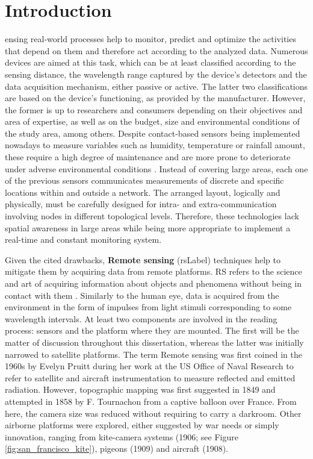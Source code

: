 \setchapterpreamble[u]{\margintoc}
\chapter{Introduction}

\lettrine[findent=0pt]{}{ }ensing real-world processes help to monitor, predict and optimize the activities that depend on them and therefore act according to the analyzed data. Numerous devices are aimed at this task, which can be at least classified according to the sensing distance, the wavelength range captured by the device's detectors and the data acquisition mechanism, either passive or active. The latter two classifications are based on the device's functioning, as provided by the manufacturer. However, the former is up to researchers and consumers depending on their objectives and area of expertise, as well as on the budget, size and environmental conditions of the study area, among others. Despite contact-based sensors being implemented nowadays to measure variables such as humidity, temperature or rainfall amount, these require a high degree of maintenance and are more prone to deteriorate under adverse environmental conditions \cite{silva_low-cost_2019, morais_versatile_2021}. Instead of covering large areas, each one of the previous sensors communicates measurements of discrete and specific locations within and outside a network. The arranged layout, logically and physically, must be carefully designed for intra- and extra-communication involving nodes in different topological levels. Therefore, these technologies lack spatial awareness in large areas while being more appropriate to implement a real-time and constant monitoring system. 

Given the cited drawbacks, \textbf{\gls{Remote sensing}} (\acrfull{rsLabel}) techniques help to mitigate them by acquiring data from remote platforms. RS refers to the science and art of acquiring information about objects and phenomena without being in contact with them \cite{lillesand_remote_2015}. Similarly to the human eye, data is acquired from the environment in the form of impulses from light stimuli corresponding to some wavelength intervals. At least two components are involved in the reading process: sensors and the platform where they are mounted. The first will be the matter of discussion throughout this dissertation, whereas the latter was initially narrowed to satellite platforms. The term \gls{Remote sensing} was first coined in the 1960s by Evelyn Pruitt during her work at the US Office of Naval Research to refer to satellite and aircraft instrumentation to measure reflected and emitted radiation. However, topographic mapping was first suggested in 1849 and attempted in 1858 by F. Tournachon from a captive balloon over France. From here, the camera size was reduced without requiring to carry a darkroom. Other airborne platforms were explored, either suggested by war needs or simply innovation, ranging from kite-camera systems (1906; see Figure \ref{fig:san_francisco_kite}), pigeons (1909) and aircraft (1908).

